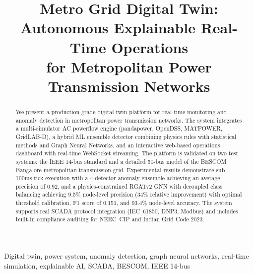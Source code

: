 \documentclass[conference]{IEEEtran}
\begin{document}
\title{Metro Grid Digital Twin:\\
Autonomous Explainable Real-Time Operations\\
for Metropolitan Power Transmission Networks}

\author{
}

\maketitle

\begin{abstract}
We present a production-grade digital twin platform for real-time monitoring and anomaly detection in metropolitan power transmission networks. The system integrates a multi-simulator AC powerflow engine (pandapower, OpenDSS, MATPOWER, GridLAB-D), a hybrid ML ensemble detector combining physics rules with statistical methods and Graph Neural Networks, and an interactive web-based operations dashboard with real-time WebSocket streaming. The platform is validated on two test systems: the IEEE 14-bus standard and a detailed 50-bus model of the BESCOM Bangalore metropolitan transmission grid. Experimental results demonstrate sub-100ms tick execution with a 4-detector anomaly ensemble achieving an average precision of 0.92, and a physics-constrained RGATv2 GNN with decoupled class balancing achieving 9.5\% node-level precision (34\% relative improvement) with optimal threshold calibration, F1 score of 0.151, and 93.4\% node-level accuracy. The system supports real SCADA protocol integration (IEC~61850, DNP3, Modbus) and includes built-in compliance auditing for NERC~CIP and Indian Grid Code 2023.
\end{abstract}

\begin{IEEEkeywords}
Digital twin, power system, anomaly detection, graph neural networks, real-time simulation, explainable AI, SCADA, BESCOM, IEEE 14-bus
\end{IEEEkeywords}
\end{document}
